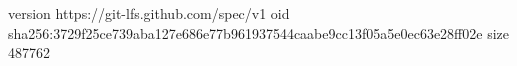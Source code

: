 version https://git-lfs.github.com/spec/v1
oid sha256:3729f25ce739aba127e686e77b961937544caabe9cc13f05a5e0ec63e28ff02e
size 487762
